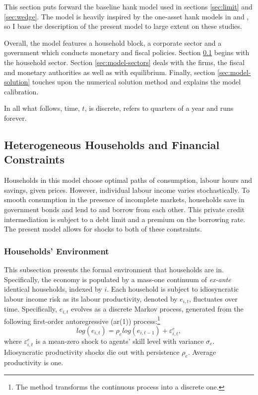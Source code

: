 \documentclass[12pt]{article} %
\numberwithin{equation}{section} %
\numberwithin{figure}{section}
\numberwithin{table}{section}
\begin{document}
This section puts forward the baseline \Gls{hank} model used in sections \ref{sec:limit} and \ref{sec:wedge}. The model is heavily inspired by the one-asset \Gls{hank} models in \textcite{auclert2021} and \textcite{boehl2023econpizza}, so I base the description of the present model to large extent on these studies.

Overall, the model features a household block, a corporate sector and a government which conducts monetary and fiscal policies. Section \ref{sec:model-hh} begins with the household sector. Section \ref{sec:model-sectors} deals with the firms, the fiscal and monetary authorities as well as with equilibrium. Finally, section \ref{sec:model-solution} touches upon the numerical solution method and explains the model calibration. 

In all what follows, time, $t$, is discrete, refers to quarters of a year and runs forever.

\subsection{Heterogeneous Households and Financial Constraints}
\label{sec:model-hh}

Households in this model choose optimal paths of consumption, labour hours and savings, given prices. However, individual labour income varies stochastically. To smooth consumption in the presence of incomplete markets, households save in government bonds and lend to and borrow from each other. This private credit intermediation is subject to a debt limit and a premium on the borrowing rate. The present model allows for shocks to both of these constraints.

\subsubsection{Households' Environment}
\label{sec:model-hh-environment}

This subsection presents the formal environment that households are in. Specifically, the economy is populated by a mass-one continuum of \textit{ex-ante} identical households, indexed by $i$. Each household is subject to idiosyncratic labour income risk as its labour productivity, denoted by $e_{i,t}$, fluctuates over time. Specifically, $e_{i,t}$ evolves as a discrete Markov process, generated from the following first-order autoregressive (\Gls{ar}(1)) process:\footnote{The \textcite{rouwenhorst1995} method transforms the continuous process into a discrete one.}
\begin{equation}
    log(e_{i,t}) = \rho_e log(e_{i,t-1}) + \varepsilon^e_{i,t}, \label{eq:hh-income-process}
\end{equation}
where $\varepsilon^e_{i,t}$ is a mean-zero shock to agents' skill level with variance $\sigma_e$. Idiosyncratic productivity shocks die out with persistence $\rho_e$. Average productivity is one. %
\end{document}
